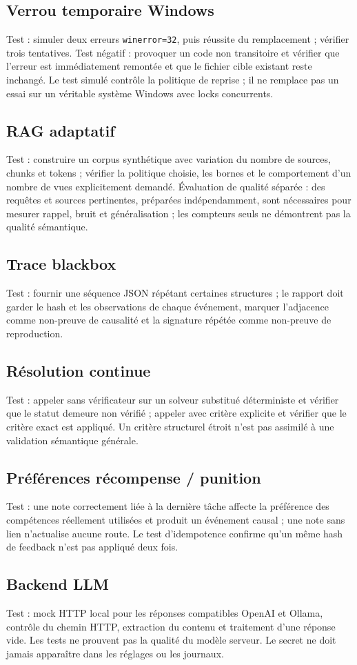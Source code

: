 \documentclass[11pt,a4paper]{article}
\begin{document}
\subsection{Verrou temporaire Windows}
Test : simuler deux erreurs \texttt{winerror=32}, puis réussite du remplacement ; vérifier trois tentatives. Test négatif : provoquer un code non transitoire et vérifier que l'erreur est immédiatement remontée et que le fichier cible existant reste inchangé. Le test simulé contrôle la politique de reprise ; il ne remplace pas un essai sur un véritable système Windows avec locks concurrents.
\subsection{RAG adaptatif}
Test : construire un corpus synthétique avec variation du nombre de sources, chunks et tokens ; vérifier la politique choisie, les bornes et le comportement d'un nombre de vues explicitement demandé. Évaluation de qualité séparée : des requêtes et sources pertinentes, préparées indépendamment, sont nécessaires pour mesurer rappel, bruit et généralisation ; les compteurs seuls ne démontrent pas la qualité sémantique.
\subsection{Trace blackbox}
Test : fournir une séquence JSON répétant certaines structures ; le rapport doit garder le hash et les observations de chaque événement, marquer l'adjacence comme non-preuve de causalité et la signature répétée comme non-preuve de reproduction.
\subsection{Résolution continue}
Test : appeler sans vérificateur sur un solveur substitué déterministe et vérifier que le statut demeure non vérifié ; appeler avec critère explicite et vérifier que le critère exact est appliqué. Un critère structurel étroit n'est pas assimilé à une validation sémantique générale.
\subsection{Préférences récompense / punition}
Test : une note correctement liée à la dernière tâche affecte la préférence des compétences réellement utilisées et produit un événement causal ; une note sans lien n'actualise aucune route. Le test d'idempotence confirme qu'un même hash de feedback n'est pas appliqué deux fois.
\subsection{Backend LLM}
Test : mock HTTP local pour les réponses compatibles OpenAI et Ollama, contrôle du chemin HTTP, extraction du contenu et traitement d'une réponse vide. Les tests ne prouvent pas la qualité du modèle serveur. Le secret ne doit jamais apparaître dans les réglages ou les journaux.
\end{document}
